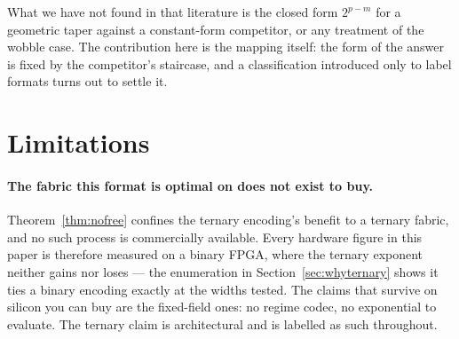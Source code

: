 \documentclass[11pt]{article}
\theoremstyle{definition}
\begin{document}
What we have not found in that literature is the closed form $2^{p-m}$ for a
geometric taper against a constant-form competitor, or any treatment of the
wobble case. The contribution here is the mapping itself: the form of the answer
is fixed by the competitor's staircase, and a classification introduced only to
label formats turns out to settle it.


\section{Limitations}

\paragraph{The fabric this format is optimal on does not exist to buy.}
Theorem~\ref{thm:nofree} confines the ternary encoding's benefit to a ternary
fabric, and no such process is commercially available. Every hardware figure in
this paper is therefore measured on a binary FPGA, where the ternary exponent
neither gains nor loses --- the enumeration in Section~\ref{sec:whyternary} shows
it ties a binary encoding exactly at the widths tested. The claims that survive on
silicon you can buy are the fixed-field ones: no regime codec, no exponential to
evaluate. The ternary claim is architectural and is labelled as such throughout.
\label{sec:limits}
\end{document}
